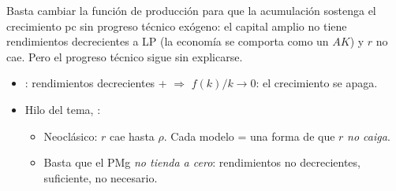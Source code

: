 \documentclass{article}
\begin{document}
\begin{columnas}
\begin{itemize}
\end{itemize}

\begin{ideaclave}
Basta cambiar la función de producción para que la acumulación sostenga el crecimiento pc sin progreso técnico exógeno: el capital amplio no tiene rendimientos decrecientes a LP (la economía se comporta como un $AK$) y $r$ no cae. Pero el progreso técnico sigue sin explicarse.
\end{ideaclave}

\begin{itemize}
\item {}: rendimientos decrecientes +  $\Rightarrow$ $f(k)/k\to0$: el crecimiento se apaga.
\item Hilo del tema, :
  \begin{itemize}
  \item Neoclásico: $r$ cae hasta $\rho$. Cada modelo = una forma de que $r$ \emph{no caiga}.
  \item Basta que el PMg \emph{no tienda a cero}: rendimientos no decrecientes, suficiente, no necesario.
  \end{itemize}
\end{itemize}


\end{columnas}
\end{document}
